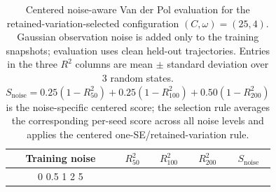 \begin{table}[t]
\centering
\small
\caption{Centered noise-aware Van der Pol evaluation for the retained-variation-selected configuration $(C,\omega)=(25,4)$. Gaussian observation noise is added only to the training snapshots; evaluation uses clean held-out trajectories. Entries in the three $R^2$ columns are mean $\pm$ standard deviation over 3 random states. $S_{\mathrm{noise}}=0.25(1-R^2_{50})+0.25(1-R^2_{100})+0.50(1-R^2_{200})$ is the noise-specific centered score; the selection rule averages the corresponding per-seed score across all noise levels and applies the centered one-SE/retained-variation rule.}
\label{tab:vdp_noise_tuned}
\begin{tabular}{ccccc}
\toprule
Training noise & $R^2_{50}$ & $R^2_{100}$ & $R^2_{200}$ & $S_{\mathrm{noise}}$ \\
\midrule
0%
0.5%
1%
2%
5%
\bottomrule
\end{tabular}
\end{table}
